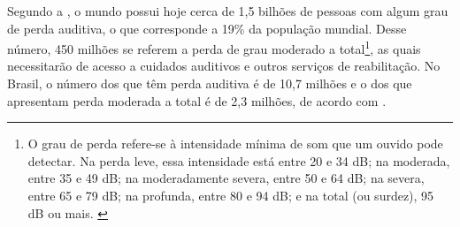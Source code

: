 Segundo a , o mundo possui hoje cerca de 1,5 bilhões de pessoas com algum grau de perda auditiva, o que corresponde a 19\% da população mundial.
Desse número, 450 milhões se referem a perda de grau moderado a total\footnote{
    O grau de perda refere-se à intensidade mínima de som que um ouvido pode detectar.
    Na perda leve, essa intensidade está entre 20 e 34 dB; na moderada, entre 35 e 49 dB; na moderadamente severa, entre 50 e 64 dB; na severa, entre 65 e 79 dB; na profunda, entre 80 e 94 dB; e na total (ou surdez), 95 dB ou mais.
    \cite[p. 38]{who-2021-report-hearing}
}, as quais necessitarão de acesso a cuidados auditivos e outros serviços de reabilitação.
No Brasil, o número dos que têm perda auditiva é de 10,7 milhões e o dos que apresentam perda moderada a total é de 2,3 milhões, de acordo com .





